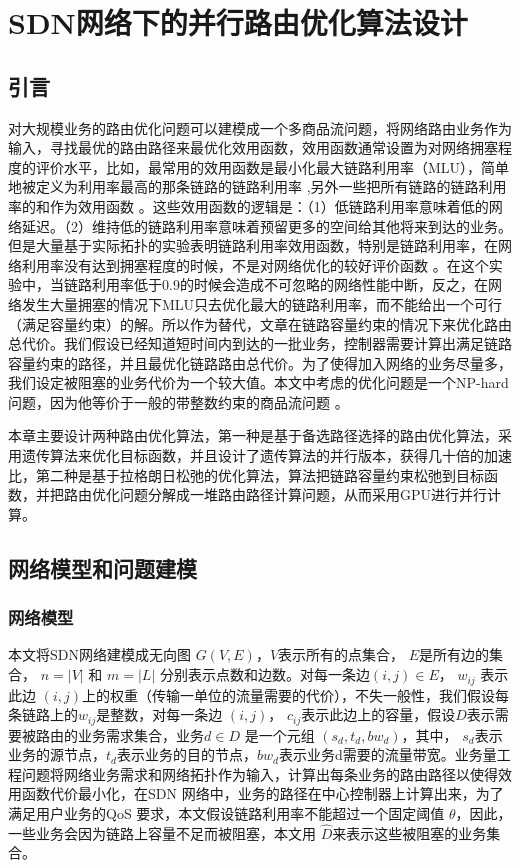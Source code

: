 \chapter{SDN网络下的并行路由优化算法设计}
\section{引言}
对大规模业务的路由优化问题可以建模成一个多商品流问题，将网络路由业务作为输入，寻找最优的路由路径来最优化效用函数，效用函数通常设置为对网络拥塞程度的评价水平，比如，最常用的效用函数是最小化最大链路利用率（MLU），简单地被定义为利用率最高的那条链路的链路利用率 \cite{MLU1, MLU2},另外一些把所有链路的链路利用率的和作为效用函数 \cite{Convex1, Convex2}。这些效用函数的逻辑是：（1）低链路利用率意味着低的网络延迟。（2）维持低的链路利用率意味着预留更多的空间给其他将来到达的业务。但是大量基于实际拓扑的实验表明链路利用率效用函数，特别是链路利用率，在网络利用率没有达到拥塞程度的时候，不是对网络优化的较好评价函数 \cite{BeyondMLU}。在这个实验中，当链路利用率低于0.9的时候会造成不可忽略的网络性能中断，反之，在网络发生大量拥塞的情况下MLU只去优化最大的链路利用率，而不能给出一个可行（满足容量约束）的解。所以作为替代，文章在链路容量约束的情况下来优化路由总代价。我们假设已经知道短时间内到达的一批业务，控制器需要计算出满足链路容量约束的路径，并且最优化链路路由总代价。为了使得加入网络的业务尽量多，我们设定被阻塞的业务代价为一个较大值。本文中考虑的优化问题是一个NP-hard问题，因为他等价于一般的带整数约束的商品流问题 \cite{NetworkFlow}。

本章主要设计两种路由优化算法，第一种是基于备选路径选择的路由优化算法，采用遗传算法来优化目标函数，并且设计了遗传算法的并行版本，获得几十倍的加速比，第二种是基于拉格朗日松弛的优化算法，算法把链路容量约束松弛到目标函数，并把路由优化问题分解成一堆路由路径计算问题，从而采用GPU进行并行计算。
\section{网络模型和问题建模}
\subsection{网络模型}

本文将SDN网络建模成无向图 $G(V, E)$，$V$表示所有的点集合， $E$是所有边的集合， $n = |V|$ 和 $m = |L|$ 分别表示点数和边数。对每一条边$(i,j)\in E$， $w_{ij}$ 表示此边 $(i,j)$上的权重（传输一单位的流量需要的代价），不失一般性，我们假设每条链路上的$w_{ij}$是整数，对每一条边 $(i,j)$， $c_{ij}$表示此边上的容量，假设$D$表示需要被路由的业务需求集合，业务$d \in D$ 是一个元组 $(s_d, t_d, bw_d)$，其中， $s_d$表示业务的源节点，$t_d$表示业务的目的节点，$bw_d$表示业务d需要的流量带宽。业务量工程问题将网络业务需求和网络拓扑作为输入，计算出每条业务的路由路径以使得效用函数代价最小化，在SDN 网络中，业务的路径在中心控制器上计算出来，为了满足用户业务的QoS 要求，本文假设链路利用率不能超过一个固定阈值 $\theta$，因此，一些业务会因为链路上容量不足而被阻塞，本文用 $\hat{D}$来表示这些被阻塞的业务集合。
